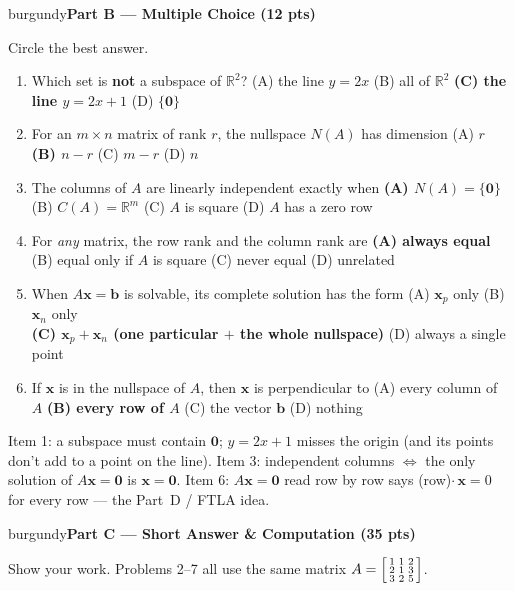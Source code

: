 \documentclass[10pt]{article}
\newcommand{\bb}{\mathbf{b}}
\newcommand{\xx}{\mathbf{x}}
\newcommand{\zero}{\mathbf{0}}
\newcommand{\parthead}[1]{%
  \vspace{6pt}\noindent
  \begin{headlinebox}{burgundy}{\color{white}\bfseries #1}\end{headlinebox}%
  \vspace{4pt}}
\begin{document}
\parthead{Part B --- Multiple Choice (12 pts)}
Circle the best answer.

\begin{enumerate}[leftmargin=1.9em, itemsep=9pt]
  \item Which set is \textbf{not} a subspace of $\mathbb{R}^2$?
    \hfill (A) the line $y=2x$ \quad (B) all of $\mathbb{R}^2$ \quad \textbf{(C) the line $y=2x+1$} \ans{$\leftarrow$} \quad (D) $\{\zero\}$
  \item For an $m\times n$ matrix of rank $r$, the nullspace $N(A)$ has dimension
    \hfill (A) $r$ \quad \textbf{(B) $n-r$} \ans{$\leftarrow$} \quad (C) $m-r$ \quad (D) $n$
  \item The columns of $A$ are linearly independent exactly when
    \hfill \textbf{(A) $N(A)=\{\zero\}$} \ans{$\leftarrow$} \quad (B) $C(A)=\mathbb{R}^m$ \quad (C) $A$ is square \quad (D) $A$ has a zero row
  \item For \emph{any} matrix, the row rank and the column rank are
    \hfill \textbf{(A) always equal} \ans{$\leftarrow$} \quad (B) equal only if $A$ is square \quad (C) never equal \quad (D) unrelated
  \item When $A\xx=\bb$ is solvable, its complete solution has the form
    \hfill (A) $\xx_p$ only \quad (B) $\xx_n$ only \\
    \phantom{x}\hfill \textbf{(C) $\xx_p+\xx_n$ (one particular $+$ the whole nullspace)} \ans{$\leftarrow$} \quad (D) always a single point
  \item If $\xx$ is in the nullspace of $A$, then $\xx$ is perpendicular to
    \hfill (A) every column of $A$ \quad \textbf{(B) every row of $A$} \ans{$\leftarrow$} \quad (C) the vector $\bb$ \quad (D) nothing
\end{enumerate}

\begin{teachernote}
Item 1: a subspace must contain $\zero$; $y=2x+1$ misses the origin (and its points don't add to a
point on the line). Item 3: independent columns $\iff$ the only solution of $A\xx=\zero$ is $\xx=\zero$.
Item 6: $A\xx=\zero$ read row by row says (row)$\cdot\,\xx=0$ for every row --- the Part~D / FTLA idea.
\end{teachernote}

\parthead{Part C --- Short Answer \& Computation (35 pts)}
Show your work. Problems 2--7 all use the same matrix
$A=\begin{bsmallmatrix}1&1&2\\2&1&3\\3&2&5\end{bsmallmatrix}$.
\end{document}
